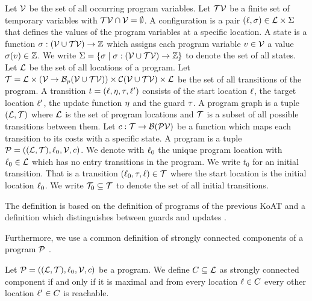 \begin{definition}[Program] 
  Let $\mathcal{V}$ be the set of all occurring program variables.
  Let $\mathcal{TV}$ be a finite set of temporary variables with $\mathcal{TV} \cap \mathcal{V} = \emptyset$.
  A configuration is a pair $(\ell, \sigma) \in \mathcal{L} \times \Sigma$ that defines the values of the program variables at a specific location.
  A state is a function $\sigma: (\mathcal{V} \cup \mathcal{TV}) \rightarrow \mathbb{Z}$ which assigns each program variable $v \in \mathcal{V}$ a value $\sigma(v) \in \mathbb{Z}$.
  We write $\Sigma = \lbrace  \sigma \mid \sigma: (\mathcal{V} \cup \mathcal{TV}) \rightarrow \mathbb{Z} \rbrace$ to denote the set of all states.
  Let $\mathcal{L}$ be the set of all locations of a program.
  Let $\mathcal{T} = \mathcal{L} \times (\mathcal{V} \rightarrow \mathcal{B}_p(\mathcal{V} \cup \mathcal{TV})) \times \mathcal{C}(\mathcal{V} \cup \mathcal{TV}) \times \mathcal{L}$ be the set of all transitions of the program.
  A transition $t = (\ell, \eta, \tau, \ell')$ consists of the start location $\ell$, the target location $\ell'$, the update function $\eta$ and the guard $\tau$. 
  A program graph is a tuple $(\mathcal{L}, \mathcal{T})$ where $\mathcal{L}$ is the set of program locations and $\mathcal{T}$ is a subset of all possible transitions between them.
  Let $c: \mathcal{T} \rightarrow \mathcal{B}(\mathcal{PV})$ be a function which maps each transition to its costs with a specific state.
  A program is a tuple $\mathcal{P} = ((\mathcal{L}, \mathcal{T}), \ell_0, \mathcal{V}, c)$.
  We denote with $\ell_0$ the unique program location with $\ell_0 \in \mathcal{L}$ which has no entry transitions in the program.
  We write $t_0$ for an initial transition. That is a transition $(\ell_0, \tau, \ell) \in \mathcal{T}$ where the start location is the initial location $\ell_0$.
  We write $\mathcal{T}_0 \subseteq \mathcal{T}$ to denote the set of all initial transitions.
\end{definition}
The definition is based on the definition of programs of the previous KoAT \cite{koat} and a definition which distinguishes between guards and updates \cite{lowerruntime}.

Furthermore, we use a common definition of strongly connected components of a program $\mathcal{P}$ \cite{sccs}.

\begin{definition}
  Let $\mathcal{P} = ((\mathcal{L}, \mathcal{T}), \ell_0, \mathcal{V}, c)$ be a program.
  We define $C \subseteq \mathcal{L}$ as strongly connected component if and only if it is maximal and from every location $\ell \in C$ every other location $\ell' \in C$ is reachable.
\end{definition}

